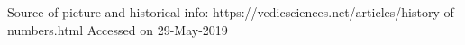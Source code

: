 Source of picture and historical info: https://vedicsciences.net/articles/history-of-numbers.html 
Accessed on 29-May-2019
